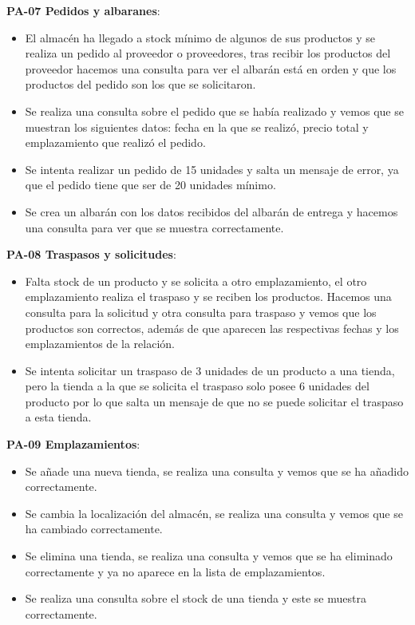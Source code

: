 \textbf{PA-07 Pedidos y albaranes}:
\begin{itemize}
	\item El almacén ha llegado a stock mínimo de algunos de sus productos y se realiza un pedido al proveedor o proveedores, tras recibir los productos del proveedor hacemos una consulta para ver el albarán está en orden y que los productos del pedido son los que se solicitaron.
	\item Se realiza una consulta sobre el pedido que se había realizado y vemos que se muestran los siguientes datos: fecha en la que se realizó, precio total y emplazamiento que realizó el pedido.
	\item Se intenta realizar un pedido de 15 unidades y salta un mensaje de error, ya que el pedido tiene que ser de 20 unidades mínimo.
	\item Se crea un albarán con los datos recibidos del albarán de entrega y hacemos una consulta para ver que se muestra correctamente.
\end{itemize}

\textbf{PA-08 Traspasos y solicitudes}:
\begin{itemize}
	\item Falta stock de un producto y se solicita a otro emplazamiento, el otro emplazamiento realiza el traspaso y se reciben los productos. Hacemos una consulta para la solicitud y otra consulta para traspaso y vemos que los productos son correctos, además de que aparecen las respectivas fechas y los emplazamientos de la relación.
	\item Se intenta solicitar un traspaso de 3 unidades de un producto a una tienda, pero la tienda a la que se solicita el traspaso solo posee 6 unidades del producto por lo que salta un mensaje de que no se puede solicitar el traspaso a esta tienda.
\end{itemize}

\textbf{PA-09 Emplazamientos}:
\begin{itemize}
	\item Se añade una nueva tienda, se realiza una consulta y vemos que se ha añadido correctamente.
	\item Se cambia la localización del almacén, se realiza una consulta y vemos que se ha cambiado correctamente.
	\item Se elimina una tienda, se realiza una consulta y vemos que se ha eliminado correctamente y ya no aparece en la lista de emplazamientos.
	\item Se realiza una consulta sobre el stock de una tienda y este se muestra correctamente.
\end{itemize}


